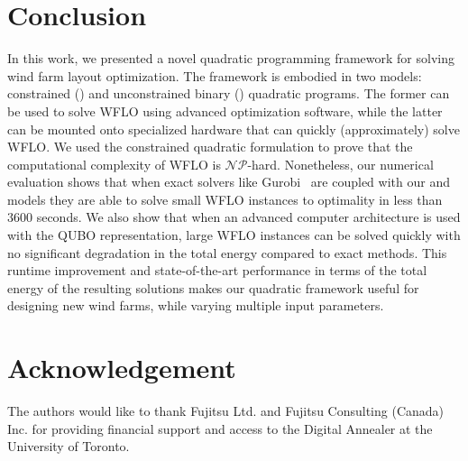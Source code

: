 \documentclass[preprint,12pt]{elsarticle}
\newcommand{\qcls}{{\sf {\small QC-LS\xspace}}}
\newcommand{\quls}{{\sf {\small QU-LS\xspace}}}
\begin{document}

  
\section{Conclusion}
\label{sec:conclusion}

In this work, we presented a novel quadratic programming framework
for solving 
wind farm layout optimization. 
The framework is embodied in two models: constrained (\qcls) and unconstrained binary
 (\quls) quadratic programs. The former can be used to solve WFLO using advanced optimization software,
while the latter can be mounted onto specialized hardware that can quickly (approximately) solve WFLO. We used the constrained quadratic formulation to prove 
that the computational complexity of WFLO is $\mathcal{NP}$-hard. Nonetheless,
our numerical evaluation shows that when exact solvers like Gurobi~\cite{gurobi} are
coupled with our \qcls{} and \quls{} models they are able to solve small WFLO instances to optimality in less than 3600 seconds.
We also show that when an advanced computer architecture is used with the QUBO representation, large WFLO instances can be solved quickly with no significant degradation in the total energy compared to exact methods.
This runtime improvement and state-of-the-art performance in terms of the total energy of the resulting solutions makes our quadratic framework useful for designing new wind farms, while varying multiple input parameters. 



\section*{Acknowledgement}
The authors would like to thank Fujitsu Ltd. and Fujitsu Consulting (Canada) Inc. for providing financial support and access to the Digital Annealer at the University of Toronto.
\end{document}
